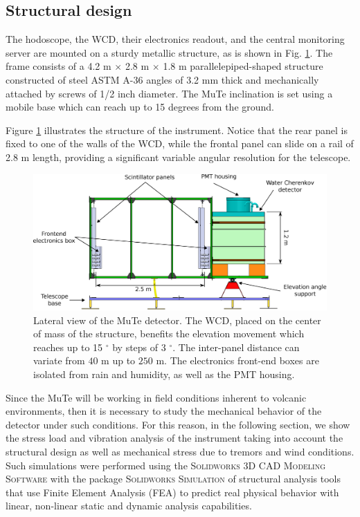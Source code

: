 \documentclass[letterpaper,11pt]{article}
\begin{document}
\subsection{Structural design}
The hodoscope, the WCD, their electronics readout, and the central monitoring server are mounted on a sturdy metallic structure, as is shown in Fig. \ref{fig:Structure}. The frame consists of a 4.2 m $\times$ 2.8 m $\times$ 1.8 m parallelepiped-shaped structure constructed of steel ASTM A-36 angles of 3.2 mm thick and mechanically attached by screws of 1/2 inch diameter. The MuTe inclination is set using a mobile base which can reach up to 15 degrees from the ground.

Figure \ref{fig:Structure} illustrates the structure of the instrument. Notice that the rear panel is fixed to one of the walls of the WCD, while the frontal panel can slide on a rail of 2.8 m length, providing a significant variable angular resolution for the telescope. 

\begin{figure}[htb]
\centering
\includegraphics[width=1\columnwidth]{Figures/Detector.eps}
\caption{Lateral view of the MuTe detector. The WCD, placed on the center of mass of the structure, benefits the elevation movement which reaches up to 15 $^{\circ}$ by steps of 3 $^{\circ}$. The inter-panel distance can variate from  $40$ m up to $250$ m. The electronics front-end boxes are isolated from rain and humidity, as well as the PMT housing.}
  \label{fig:Structure}
\end{figure}

Since the MuTe will be working in field conditions inherent to volcanic environments, then it is necessary to study the mechanical behavior of the detector under such conditions. For this reason, in the following section, we show the stress load and vibration analysis of the instrument taking into account the structural design as well as mechanical stress due to tremors and wind conditions. Such simulations were performed using the \textsc{Solidworks 3D CAD Modeling Software} with the package \textsc{Solidworks Simulation} of structural analysis tools that use Finite Element Analysis (FEA) to predict real physical behavior with linear, non-linear static and dynamic analysis capabilities.
\end{document}
